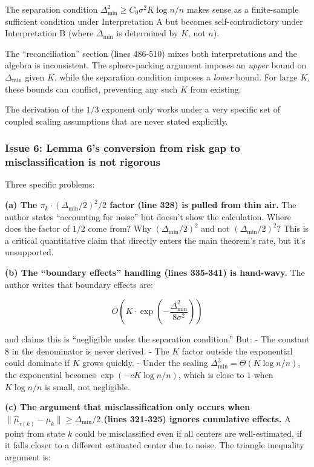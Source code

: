 \documentclass[
  12pt,
]{article}
\begin{document}
The separation condition
\(\Delta_{\min}^2 \geq C_0 \sigma^2 K \log n / n\) makes sense as a
finite-sample sufficient condition under Interpretation A but becomes
self-contradictory under Interpretation B (where \(\Delta_{\min}\) is
determined by \(K\), not \(n\)).

The ``reconciliation'' section (lines 486-510) mixes both
interpretations and the algebra is inconsistent. The sphere-packing
argument imposes an \emph{upper} bound on \(\Delta_{\min}\) given \(K\),
while the separation condition imposes a \emph{lower} bound. For large
\(K\), these bounds can conflict, preventing any such \(K\) from
existing.

The derivation of the \(1/3\) exponent only works under a very specific
set of coupled scaling assumptions that are never stated explicitly.

\subsubsection{Issue 6: Lemma 6's conversion from risk gap to
misclassification is not
rigorous}\label{issue-6-lemma-6s-conversion-from-risk-gap-to-misclassification-is-not-rigorous}

Three specific problems:

\textbf{(a) The \(\pi_k \cdot (\Delta_{\min}/2)^2 / 2\) factor (line
328) is pulled from thin air.} The author states ``accounting for
noise'' but doesn't show the calculation. Where does the factor of
\(1/2\) come from? Why \((\Delta_{\min}/2)^2\) and not
\((\Delta_{\min}/2)^2\)? This is a critical quantitative claim that
directly enters the main theorem's rate, but it's unsupported.

\textbf{(b) The ``boundary effects'' handling (lines 335-341) is
hand-wavy.} The author writes that boundary effects are:

\[O\left(K \cdot \exp\left(-\frac{\Delta_{\min}^2}{8\sigma^2}\right)\right)\]

and claims this is ``negligible under the separation condition.'' But: -
The constant \(8\) in the denominator is never derived. - The \(K\)
factor outside the exponential could dominate if \(K\) grows quickly. -
Under the scaling \(\Delta_{\min}^2 = \Theta(K \log n / n)\), the
exponential becomes \(\exp(-c K \log n / n)\), which is close to \(1\)
when \(K \log n / n\) is small, not negligible.

\textbf{(c) The argument that misclassification only occurs when
\(\|\hat{\mu}_{\tau(k)} - \mu_k\| \geq \Delta_{\min}/2\) (lines 321-325)
ignores cumulative effects.} A point from state \(k\) could be
misclassified even if all centers are well-estimated, if it falls closer
to a different estimated center due to noise. The triangle inequality
argument is:
\end{document}
